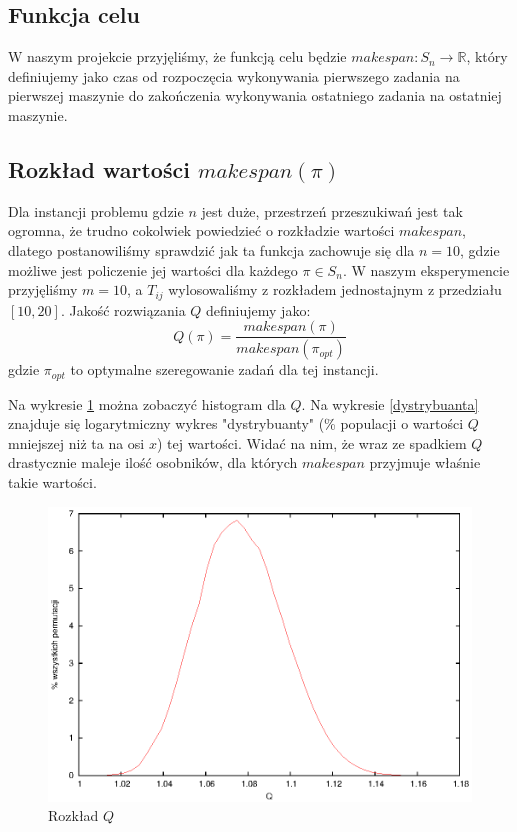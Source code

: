 \documentclass[11pt, a4wide]{article}
\begin{document}
\subsection{Funkcja celu}
W naszym projekcie przyjęliśmy, że funkcją celu będzie  $ makespan : S_n \rightarrow \mathbb{R} $, który
definiujemy jako czas od rozpoczęcia wykonywania pierwszego zadania na pierwszej maszynie do 
zakończenia wykonywania ostatniego zadania na ostatniej maszynie.

\subsection{Rozkład wartości $makespan(\pi)$}
Dla instancji problemu gdzie $n$ jest duże, przestrzeń przeszukiwań jest tak ogromna, że trudno
cokolwiek powiedzieć o rozkładzie wartości $makespan$, dlatego postanowiliśmy sprawdzić jak ta funkcja
zachowuje się dla $n = 10$, gdzie możliwe jest policzenie jej wartości dla każdego $\pi \in S_n$.
W naszym eksperymencie przyjęliśmy $m = 10$, a $T_{ij}$ wylosowaliśmy z rozkładem jednostajnym 
z przedziału $[10, 20]$. Jakość rozwiązania $Q$ definiujemy jako:
$$ Q(\pi) = \frac{makespan(\pi)}{makespan(\pi_{opt})}$$
gdzie $\pi_{opt}$ to optymalne szeregowanie zadań dla tej instancji.

Na wykresie \ref{rozklad} można zobaczyć histogram dla $Q$. Na wykresie \ref{dystrybuanta} znajduje 
się logarytmiczny wykres "dystrybuanty" (\% populacji o wartości $Q$ mniejszej niż ta na osi $x$) tej 
wartości. Widać na nim, że wraz ze spadkiem $Q$ drastycznie maleje ilość osobników, dla których $makespan$
przyjmuje właśnie takie wartości.


\begin{figure}[H]
\caption{Rozkład $Q$}
\label{rozklad}
\begin{center}
  \includegraphics{histogram.eps}
\end{center}
\end{figure}
\end{document}
